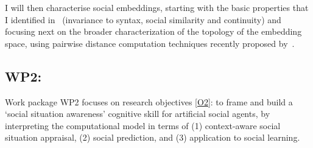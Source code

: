 I will then characterise social embeddings, starting with the basic properties
that I identified in~\cite{lemaignan2024social} (invariance to syntax, social
similarity and continuity) and focusing next on the broader characterization of the
topology of the embedding space, using pairwise distance computation techniques
recently proposed by~\cite{sun2023topological}.



\subsection{WP2: \textbf{\WPB} 
           {\newline\footnotesize{}}}

Work package WP2 focuses on research objectives \ref{O2}: to frame and build a
`social situation awareness' cognitive skill for artificial social agents, 
by interpreting the \project computational model in terms of (1) context-aware
social situation appraisal, (2) social prediction, and (3) application to social
learning.





